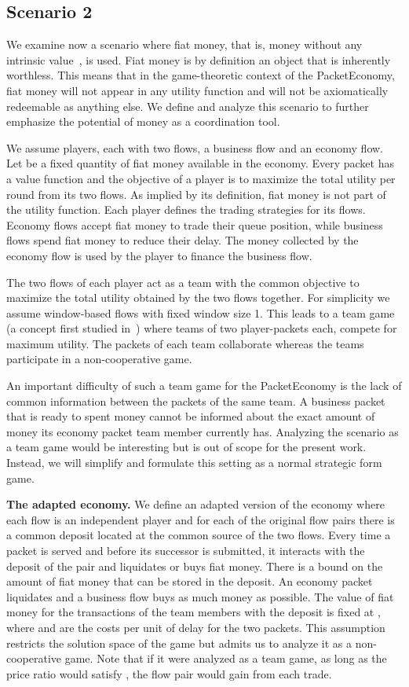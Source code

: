 \documentclass[letterpaper,10pt]{llncs}
\begin{document}
\subsection{Scenario 2}
\label{sec:ScenarioFiat}
We examine now a scenario where fiat money, that is, money without any intrinsic value~\cite{Mankiw:2008:Economics}, is used. Fiat money is by definition an object that 
is inherently worthless. This means that in the game-theoretic context of the PacketEconomy,
fiat money will not appear in any utility function and will not be axiomatically redeemable as anything else. We define and analyze this scenario to further emphasize the potential of money as a coordination tool.

We assume  players, each with two flows, a business flow and an economy flow.
Let  be a fixed quantity of fiat money available in the economy. Every packet has 
a value function and the objective of a player is to maximize the total utility
per round from its two flows. As implied by its definition, fiat money is not part of the utility
function.
Each player defines the trading strategies for its flows. Economy flows accept fiat
money to trade their queue position, while business flows spend fiat money to reduce their
delay. The money collected by the economy flow is used by the player to finance the  
business flow.

The two flows of each player act as a team with the common objective to maximize the total
utility obtained by the two flows together. For simplicity we assume window-based flows with 
fixed window size 1. This leads to a team game (a concept first studied in~\cite{Palfrey:1983:Team}) 
where teams of two player-packets each, compete for maximum utility.
The packets of each team collaborate whereas the teams participate in a non-cooperative game. 

An important difficulty of such a team game for the PacketEconomy is the lack of 
common information between the packets of the same team. A business
packet that is ready to spent money cannot be informed about the exact amount 
of money its economy packet team member currently has. 
Analyzing the scenario as a team game would be interesting
but is out of scope for the present work. 
Instead, we will simplify and formulate this setting as a normal strategic form game. 

{\bf The adapted economy.} We define an adapted version of the economy where 
each flow is an independent player and for each of the original flow pairs there
is a common deposit located at the common source of the two flows. Every time a packet is served
and before its successor is submitted, it interacts with the deposit of the pair and liquidates or buys fiat money. There is a bound  on the amount of fiat money that can be stored in the deposit.
An economy packet liquidates and a business flow buys as much money as possible. The value of fiat money for the transactions of the team members with 
the deposit is fixed at , where  and  are the costs per unit
of delay for the two packets. This assumption restricts the solution space of the game
but admits us to analyze it as a non-cooperative game. Note that if it were analyzed as a team game, 
as long as the price ratio  would satisfy , the flow pair would gain from each trade. 
\end{document}
